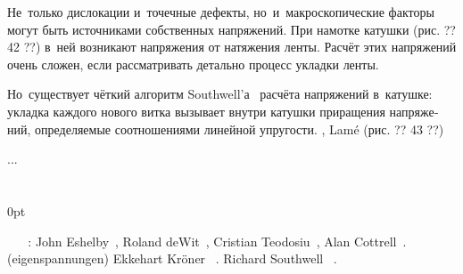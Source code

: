 
\label{section:coilwindingstress}

\begin{otherlanguage}{russian}

Не~только дислокации и~точечные дефекты, но~и~макроскопические факторы могут быть источниками собственных напряжений.
При намотке катушки (рис. ?? 42 ??) в~ней возникают напряжения от натяжения ленты.
Расчёт этих напряжений очень сложен, если рассматривать детально процесс укладки ленты.

Но~существует чёткий алгоритм Southwell’а~\cite{southwell-introductiontotheoryofelasticity} расчёта напряжений в~катушке: укладка каждого нового витка вызывает внутри катушки приращения напряжений, определяемые соотношениями линейной упругости.
,    Lam\'{e}    (рис. ?? 43 ??)

...



\end{otherlanguage}

\section*{\small \wordforbibliography}

\begin{changemargin}{\parindent}{0pt}
\fontsize{10}{12}\selectfont

 ~ ~   :
John Eshelby~\cite{eshelby-theoryofdislocations},
Roland deWit~\cite{dewit-disclinations},
Cristian Teodosiu~\cite{teodosiu-crystaldefects},
Alan Cottrell~\cite{cottrell-dislocations}.
 (eigenspannungen)   Ekkehart Kröner ~\cite{kroener-kontinuumstheorie}.
   Richard Southwell ~\cite{southwell-introductiontotheoryofelasticity}.

\end{changemargin}
